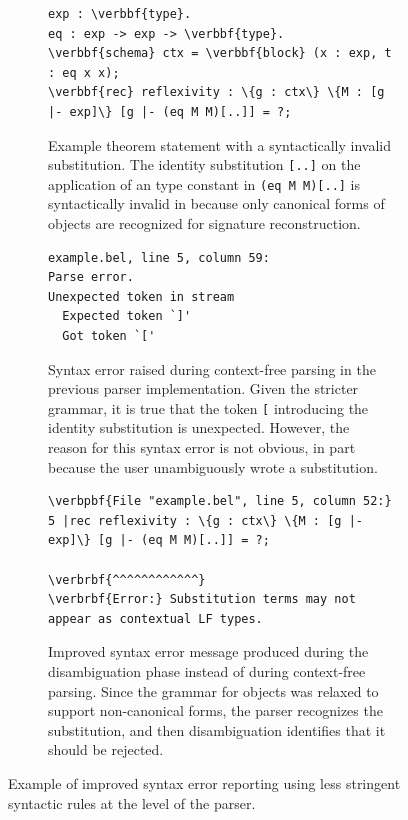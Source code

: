 \begin{figure}[!htb]
\begin{subfigure}{\linewidth}
\begin{Verbatim}[commandchars=\\\{\}, baselinestretch=1]
exp : \verbbf{type}.
eq : exp -> exp -> \verbbf{type}.
\verbbf{schema} ctx = \verbbf{block} (x : exp, t : eq x x);
\verbbf{rec} reflexivity : \{g : ctx\} \{M : [g |- exp]\} [g |- (eq M M)[..]] = ?;
\end{Verbatim}
\caption{%
Example theorem statement with a syntactically invalid substitution.
The identity substitution \texttt{[..]} on the application of an \LF type constant in \texttt{(eq M M)[..]} is syntactically invalid in \Beluga because only canonical forms of \LF objects are recognized for signature reconstruction.
}
\end{subfigure}
\begin{subfigure}{\linewidth}
\begin{Verbatim}[baselinestretch=1]
example.bel, line 5, column 59:
Parse error.
Unexpected token in stream
  Expected token `]'
  Got token `['
\end{Verbatim}
\caption{%
Syntax error raised during context-free parsing in the previous parser implementation.
Given the stricter grammar, it is true that the token \texttt{[} introducing the identity substitution is unexpected.
However, the reason for this syntax error is not obvious, in part because the user unambiguously wrote a substitution.
}
\end{subfigure}
\begin{subfigure}{\linewidth}
\begin{Verbatim}[commandchars=\\\{\}, baselinestretch=1]
\verbpbf{File "example.bel", line 5, column 52:}
5 |rec reflexivity : \{g : ctx\} \{M : [g |- exp]\} [g |- (eq M M)[..]] = ?;
                                                      \verbrbf{^^^^^^^^^^^^}      
\verbrbf{Error:} Substitution terms may not appear as contextual LF types.
\end{Verbatim}
\caption{%
Improved syntax error message produced during the disambiguation phase instead of during context-free parsing.
Since the grammar for \LF objects was relaxed to support non-canonical forms, the parser recognizes the substitution, and then disambiguation identifies that it should be rejected.
}
\end{subfigure}
\caption[Example of improved syntax error reporting]{%
Example of improved syntax error reporting using less stringent syntactic rules at the level of the parser.
}
\end{figure}

